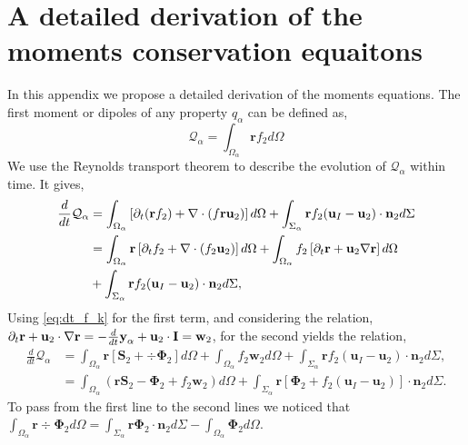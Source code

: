 \section{A detailed derivation of the moments conservation equaitons}
\label{ap:moment_derivative}
In this appendix we propose a detailed derivation of the moments equations. 
The first moment or dipoles of any property $q_\alpha$ can be defined as,
\begin{equation*}
    \mathcal{Q}_\alpha 
    = \int_{\Omega_\alpha} \textbf{r} f_2 d\Omega
\end{equation*}
We use the Reynolds transport theorem to describe the evolution of $\mathcal{Q}_\alpha$ within time. 
It gives, 
\begin{align*}
    \frac{d}{dt} \mathcal{Q}_\alpha
      &=  \int_{\Omega_\alpha} \left[
        \partial_t(\textbf{r}  f_2)
        + \mathbf{\nabla}\cdot \left(f \textbf{r} \textbf{u}_2\right)
    \right]d\Omega + \int_{\Sigma_\alpha} \textbf{r}  f_2  (\textbf{u}_I-\textbf{u}_2)\cdot \textbf{n}_2  d\Sigma  \nonumber \\
    &=  \int_{\Omega_\alpha} \textbf{r}\left[
        \partial_t f_2
        + \mathbf{\nabla}\cdot \left(f_2 \textbf{u}_2\right)
    \right] d\Omega
    + \int_{\Omega_\alpha} f_2 \left[
        \partial_t \textbf{r}
        +\textbf{u}_2 \mathbf{\nabla} \textbf{r}
    \right]d\Omega\\
    &+ \int_{\Sigma_\alpha} \textbf{r}  f_2 (\textbf{u}_I-\textbf{u}_2)\cdot \textbf{n}_2  d\Sigma,
\end{align*}
Using \ref{eq:dt_f_k} for the first term, and considering the relation,
$  \partial_t \textbf{r}
+ \textbf{u}_2 \cdot \mathbf{\nabla} \textbf{r}
= - \frac{d}{dt} \textbf{y}_\alpha  + \textbf{u}_2 \cdot \textbf{I}
= \textbf{w}_2$,
for the second yields the relation,
\begin{align*}
    \frac{d}{dt} \mathcal{Q}_\alpha
    &= \int_{\Omega_\alpha} \textbf{r} \left[
         \textbf{S}_2 +  \div \mathbf{\Phi}_2
    \right]d\Omega
    +\int_{\Omega_\alpha} f_2  \textbf{w}_2 d\Omega
    + \int_{\Sigma_\alpha} \textbf{r}  f_2 (\textbf{u}_I-\textbf{u}_2)\cdot \textbf{n}_2  d\Sigma,\\
    &= \int_{\Omega_\alpha} \left( 
        \textbf{r} \textbf{S}_2 
        - \mathbf{\Phi}_2
        + f_2  \textbf{w}_2 
    \right) d\Omega
    + \int_{\Sigma_\alpha} \textbf{r} \left[
        \mathbf{\Phi}_2
        + f_2 (\textbf{u}_I-\textbf{u}_2)
    \right]\cdot \textbf{n}_2  d\Sigma.
\end{align*}
To pass from the first line to the second lines we noticed that $\int_{\Omega_\alpha} \textbf{r}  \div \mathbf{\Phi}_2 d\Omega
= \int_{\Sigma_\alpha} \textbf{r} \mathbf{\Phi}_2 \cdot \textbf{n}_2 d\Sigma
- \int_{\Omega_\alpha} \mathbf{\Phi}_2 d\Omega$. 

